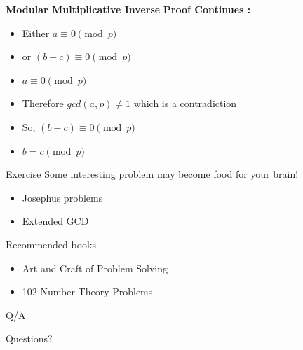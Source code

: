 \documentclass{beamer}
\begin{document}
\begin{frame}{\textbf{Modular Multiplicative Inverse}}
    \textbf{Proof Continues :}
    \begin{center}
        \begin{itemize}
            \item <1-> Either $a\equiv 0 \pmod p$
            \item <2-> or $(b-c) \equiv 0 \pmod p$
            \item <3-> $a\equiv 0 \pmod p$
            \item<4-> Therefore $gcd(a,p) \neq 1 $ which is a contradiction
            \item<5-> So, $(b-c) \equiv 0 \pmod p$
            \item<6-> $b = c \pmod p$
        \end{itemize}
    \end{center}
\end{frame}

\begin{frame}{Exercise}
    Some interesting problem may become food for your brain!
    \begin{itemize}
        \item Josephus problems
        \item Extended GCD
    \end{itemize}
    Recommended books -
    \begin{itemize}
        \item Art and Craft of Problem Solving
        \item 102 Number Theory Problems
    \end{itemize}
\end{frame}

\begin{frame}{Q/A}
\begin{block}{}
\begin{center}
   \huge { Questions? }
\end{center}
\end{block}
\end{frame}
\end{document}
